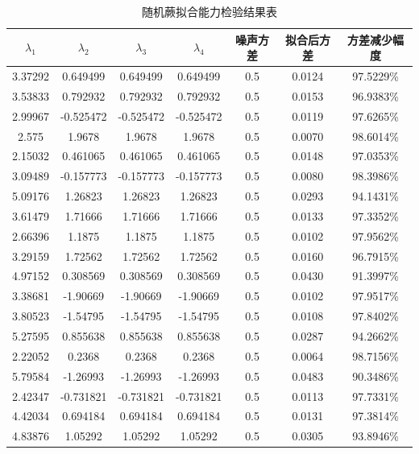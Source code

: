 \begin{table}[htb]
	\caption{随机蕨拟合能力检验结果表} 
	\centering 
	\begin{tabular}[t]{
		ccccccc} 
		\toprule
		$\lambda_1$ & $\lambda_2$ & $\lambda_3$ & $\lambda_4$ & 噪声方差 & 拟合后方差 & 方差减少幅度\\ 
		\midrule
		3.37292 & 0.649499 & 0.649499 & 0.649499 & 0.5 &    0.0124&    97.5229\% \\
		3.53833 & 0.792932 & 0.792932 & 0.792932 & 0.5 &    0.0153&    96.9383\% \\
		2.99967 & -0.525472 & -0.525472 & -0.525472 & 0.5 &    0.0119&    97.6265\% \\
		2.575 & 1.9678 & 1.9678 & 1.9678 & 0.5 &    0.0070&    98.6014\% \\
		2.15032 & 0.461065 & 0.461065 & 0.461065 & 0.5 &    0.0148&    97.0353\% \\
		3.09489 & -0.157773 & -0.157773 & -0.157773 & 0.5 &    0.0080&    98.3986\% \\
		5.09176 & 1.26823 & 1.26823 & 1.26823 & 0.5 &    0.0293 &    94.1431\% \\
		3.61479 & 1.71666 & 1.71666 & 1.71666 & 0.5 &    0.0133&    97.3352\% \\
		2.66396 & 1.1875 & 1.1875 & 1.1875 & 0.5 &    0.0102&    97.9562\% \\
		3.29159 & 1.72562 & 1.72562 & 1.72562 & 0.5 &    0.0160&    96.7915\% \\
		4.97152 & 0.308569 & 0.308569 & 0.308569 & 0.5 &    0.0430&    91.3997\% \\
		3.38681 & -1.90669 & -1.90669 & -1.90669 & 0.5 &    0.0102&    97.9517\% \\
		3.80523 & -1.54795 & -1.54795 & -1.54795 & 0.5 &    0.0108&    97.8402\% \\
		5.27595 & 0.855638 & 0.855638 & 0.855638 & 0.5 &    0.0287 &    94.2662\% \\
		2.22052 & 0.2368 & 0.2368 & 0.2368 & 0.5 &    0.0064&    98.7156\% \\
		5.79584 & -1.26993 & -1.26993 & -1.26993 & 0.5 &    0.0483&    90.3486\% \\
		2.42347 & -0.731821 & -0.731821 & -0.731821 & 0.5 &    0.0113&    97.7331\% \\
		4.42034 & 0.694184 & 0.694184 & 0.694184 & 0.5 &    0.0131&    97.3814\% \\
		4.83876 & 1.05292 & 1.05292 & 1.05292 & 0.5 &    0.0305&    93.8946\% \\
		\bottomrule
	\end{tabular}
\end{table}


